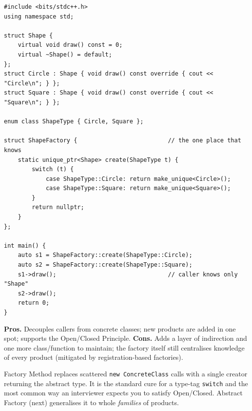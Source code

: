 \begin{lstlisting}
#include <bits/stdc++.h>
using namespace std;

struct Shape {
    virtual void draw() const = 0;
    virtual ~Shape() = default;
};
struct Circle : Shape { void draw() const override { cout << "Circle\n"; } };
struct Square : Shape { void draw() const override { cout << "Square\n"; } };

enum class ShapeType { Circle, Square };

struct ShapeFactory {                          // the one place that knows
    static unique_ptr<Shape> create(ShapeType t) {
        switch (t) {
            case ShapeType::Circle: return make_unique<Circle>();
            case ShapeType::Square: return make_unique<Square>();
        }
        return nullptr;
    }
};

int main() {
    auto s1 = ShapeFactory::create(ShapeType::Circle);
    auto s2 = ShapeFactory::create(ShapeType::Square);
    s1->draw();                                // caller knows only "Shape"
    s2->draw();
    return 0;
}
\end{lstlisting}

\begin{complexitybox}
\textbf{Pros.} Decouples callers from concrete classes; new products are
added in one spot; supports the Open/Closed Principle. \textbf{Cons.} Adds
a layer of indirection and one more class/function to maintain; the
factory itself still centralises knowledge of every product (mitigated by
registration-based factories).
\end{complexitybox}

\begin{takeawaybox}
Factory Method replaces scattered \texttt{new ConcreteClass} calls with a
single creator returning the abstract type. It is the standard cure for a
type-tag \texttt{switch} and the most common way an interviewer expects
you to satisfy Open/Closed. Abstract Factory (next) generalises it to
whole \emph{families} of products.
\end{takeawaybox}
